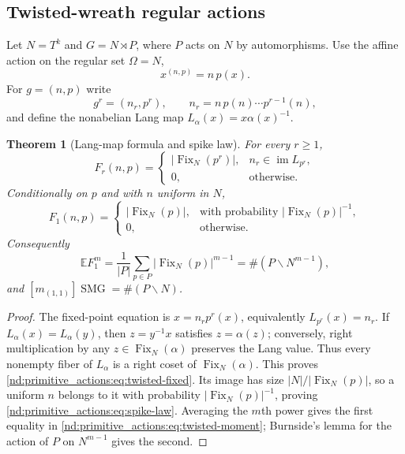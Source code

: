 \documentclass[10pt]{article}
\newcommand{\Fix}{\operatorname{Fix}}
\newcommand{\SMG}{\operatorname{SMG}}
\newcommand{\MGF}{\SMG}
\newcommand{\E}{\mathbb E}
\newcommand{\im}{\operatorname{im}}
\newtheorem{theorem}{Theorem}
\begin{document}
\subsection{Twisted-wreath regular actions}

Let $N=T^k$ and $G=N\rtimes P$, where $P$ acts on $N$ by automorphisms.
Use the affine action on the regular set $\Omega=N$,
\[
 x^{(n,p)}=n\,p(x).
\]
For $g=(n,p)$ write
\[
 g^r=(n_r,p^r),\qquad
 n_r=n\,p(n)\cdots p^{r-1}(n),
\]
and define the nonabelian Lang map $L_\alpha(x)=x\alpha(x)^{-1}$.

\begin{theorem}[Lang-map formula and spike law]\label{nd:primitive_actions:thm:twisted}
For every $r\ge1$,
\begin{equation}\label{nd:primitive_actions:eq:twisted-fixed}
 \boxed{F_r(n,p)=
 \begin{cases}
 |\Fix_N(p^r)|,&n_r\in\im L_{p^r},\\
 0,&\text{otherwise}.
 \end{cases}}
\end{equation}
Conditionally on $p$ and with $n$ uniform in $N$,
\begin{equation}\label{nd:primitive_actions:eq:spike-law}
 \boxed{F_1(n,p)=
 \begin{cases}
 |\Fix_N(p)|,&\text{with probability }|\Fix_N(p)|^{-1},\\
 0,&\text{otherwise}.
 \end{cases}}
\end{equation}
Consequently
\begin{equation}\label{nd:primitive_actions:eq:twisted-moment}
 \boxed{\E F_1^m=\frac1{|P|}\sum_{p\in P}|\Fix_N(p)|^{m-1}
 =\#(P\backslash N^{m-1}),}
\end{equation}
and $[m_{(1,1)}]\MGF=\#(P\backslash N)$.
\end{theorem}

\begin{proof}
The fixed-point equation is $x=n_rp^r(x)$, equivalently
$L_{p^r}(x)=n_r$.  If $L_\alpha(x)=L_\alpha(y)$, then
$z=y^{-1}x$ satisfies $z=\alpha(z)$; conversely, right multiplication by
any $z\in\Fix_N(\alpha)$ preserves the Lang value.  Thus every nonempty
fiber of $L_\alpha$ is a right coset of $\Fix_N(\alpha)$.  This proves
\eqref{nd:primitive_actions:eq:twisted-fixed}.  Its image has size
$|N|/|\Fix_N(p)|$, so a uniform $n$ belongs to it with probability
$|\Fix_N(p)|^{-1}$, proving \eqref{nd:primitive_actions:eq:spike-law}.  Averaging the $m$th
power gives the first equality in \eqref{nd:primitive_actions:eq:twisted-moment}; Burnside's lemma
for the action of $P$ on $N^{m-1}$ gives the second.
\end{proof}
\end{document}
